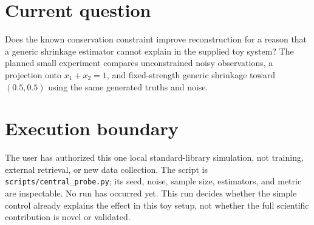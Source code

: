 \section{Current question}
Does the known conservation constraint improve reconstruction for a reason that a generic shrinkage estimator cannot explain in the supplied toy system?
The planned small experiment compares unconstrained noisy observations, a projection onto $x_1+x_2=1$, and fixed-strength generic shrinkage toward $(0.5,0.5)$ using the same generated truths and noise.

\section{Execution boundary}
The user has authorized this one local standard-library simulation, not training, external retrieval, or new data collection. The script is \texttt{scripts/central_probe.py}; its seed, noise, sample size, estimators, and metric are inspectable. No run has occurred yet. This run decides whether the simple control already explains the effect in this toy setup, not whether the full scientific contribution is novel or validated.

